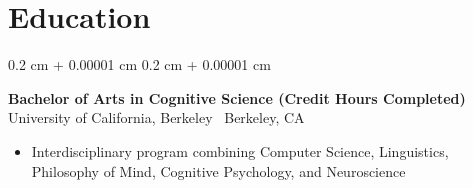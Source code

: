 \documentclass[10pt, letterpaper]{article}
\newenvironment{highlights}{
    \begin{itemize}[
        topsep=0.10 cm,
        parsep=0.10 cm,
        partopsep=0pt,
        itemsep=0pt,
        leftmargin=0.4 cm + 10pt
    ]
}{
    \end{itemize}
} %
\newenvironment{onecolentry}{
    \begin{adjustwidth}{
        0.2 cm + 0.00001 cm
    }{
        0.2 cm + 0.00001 cm
    }
}{
    \end{adjustwidth}
} %
\begin{document}
        

        

        \vspace{0.2 cm}

    \section{Education}

        

            \begin{onecolentry}
                \textbf{Bachelor of Arts in Cognitive Science (Credit Hours Completed)} \\
                University of California, Berkeley \textbar\ Berkeley, CA 
                \begin{highlights}
                    \item Interdisciplinary program combining Computer Science, Linguistics, Philosophy of Mind, Cognitive Psychology, and Neuroscience
                \end{highlights}
            \end{onecolentry}
        
        

        
\end{document}

